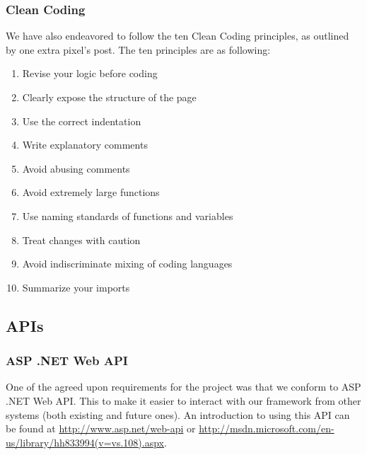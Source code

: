 \subsubsection{Clean Coding}\label{cleanCoding}
We have also endeavored to follow the ten Clean Coding principles, as outlined by one extra pixel's post. \cite{cleanCoding}
The ten principles are as following:
\begin{enumerate}

\item Revise your logic before coding
\item Clearly expose the structure of the page
\item Use the correct indentation
\item Write explanatory comments
\item Avoid abusing comments
\item Avoid extremely large functions
\item Use naming standards of functions and variables
\item Treat changes with caution
\item Avoid indiscriminate mixing of coding languages
\item Summarize your imports

\end{enumerate}

\subsection{APIs}
\subsubsection{ASP .NET Web API}
One of the agreed upon requirements for the project was that we conform to ASP .NET Web API. This to make it easier to interact with our framework from other systems (both existing and future ones). An introduction to using this API can be found at \href{http://www.asp.net/web-api}{http://www.asp.net/web-api} or \href{http://msdn.microsoft.com/en-us/library/hh833994(v=vs.108).aspx}{http://msdn.microsoft.com/en-us/library/hh833994(v=vs.108).aspx}.
